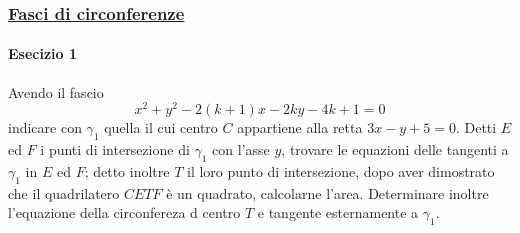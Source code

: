 \subsubsection*{\hyperref[subsec:geomanal:fasciocirc]{Fasci di circonferenze}}
\paragraph{Esecizio 1}
Avendo il fascio
\begin{equation*}
  x^2+y^2-2(k+1)x-2ky-4k+1=0
\end{equation*}
indicare con $\gamma_1$ quella il cui centro $C$ appartiene
alla retta $3x-y+5=0$. Detti $E$ ed $F$ i punti di intersezione di $\gamma_1$ con l'asse $y$, trovare
le equazioni delle tangenti a $\gamma_1$ in $E$ ed $F$; detto inoltre $T$ il loro punto di 
intersezione, dopo aver dimostrato che il quadrilatero $CETF$ è un quadrato, calcolarne l'area. 
Determinare inoltre l'equazione della circonfereza d centro $T$ e tangente esternamente a $\gamma_1$.
\divisor

